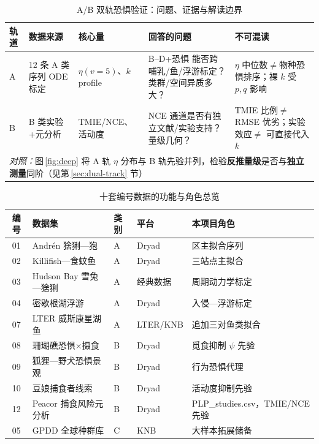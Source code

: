 \documentclass[12pt,a4paper]{ctexart}
\begin{document}
\begin{table}[H]
  \centering
  \caption{A/B 双轨恐惧验证：问题、证据与解读边界}
  \label{tab:dual-track}
  \footnotesize
  \renewcommand{\arraystretch}{1.12}
  \begin{tabular}{p{0.8cm}p{2.2cm}p{2.5cm}p{3.2cm}>{\RaggedRight\arraybackslash}p{4.0cm}}
    \toprule
    轨道 & 数据来源 & 核心量 & 回答的问题 & 不可混读 \\
    \midrule
    A &
    12 条 A 类序列 ODE 标定 &
    $\eta(v=5)$、$k$ profile &
    B--D+恐惧 能否跨哺乳/鱼/浮游标定？类群/空间异质多大？ &
    $\eta$ 中位数$\neq$物种恐惧排序；裸 $k$ 受 $p,q$ 影响 \\
    B &
    B 类实验+元分析 &
    TMIE/NCE、活动度 &
    NCE 通道是否有独立文献/实验支持？量级几何？ &
    TMIE 比例$\neq$ RMSE 优劣；实验效应$\neq$ 可直接代入 $k$ \\
    \midrule
    \multicolumn{5}{l}{\textit{对照：}图\,\ref{fig:deep} 将 A 轨 $\eta$ 分布与 B 轨先验并列，检验\textbf{反推量级}是否与\textbf{独立测量}同阶（见第\,\ref{sec:dual-track} 节）} \\
    \bottomrule
  \end{tabular}
\end{table}

\begin{table}[H]
  \centering
  \caption{十套编号数据的功能与角色总览}
  \label{tab:data-overview}
  \footnotesize
  \setlength{\tabcolsep}{3pt}
  \begin{tabular}{clll>{\RaggedRight\arraybackslash}p{3.8cm}}
    \toprule
    编号 & 数据集 & 类别 & 平台 & 本项目角色 \\
    \midrule
    01 & Andrén 猞猁—狍 & A & Dryad & 7 区主拟合序列 \\
    02 & Killifish—食蚊鱼 & A & Dryad & 三站点主拟合 \\
    03 & Hudson Bay 雪兔—猞猁 & A & 经典数据 & 周期动力学标定 \\
    04 & 密歇根湖浮游 & A & Dryad & 入侵—浮游标定 \\
    07 & LTER 威斯康星湖鱼 & A & LTER/KNB & 追加三对鱼类拟合 \\
    08 & 珊瑚礁恐惧×摄食 & B & Dryad & 觅食抑制 $\psi$ 先验 \\
    09 & 狐狸—野犬恐惧景观 & B & Dryad & 行为恐惧代理 \\
    10 & 豆娘捕食者线索 & B & Dryad & 活动度抑制先验 \\
    12 & Peacor 捕食风险元分析 & B & Dryad & PLP\_studies.csv，TMIE/NCE 先验 \\
    05 & GPDD 全球种群库 & C & KNB & 大样本拓展储备 \\
    \bottomrule
  \end{tabular}
\end{table}
\end{document}
